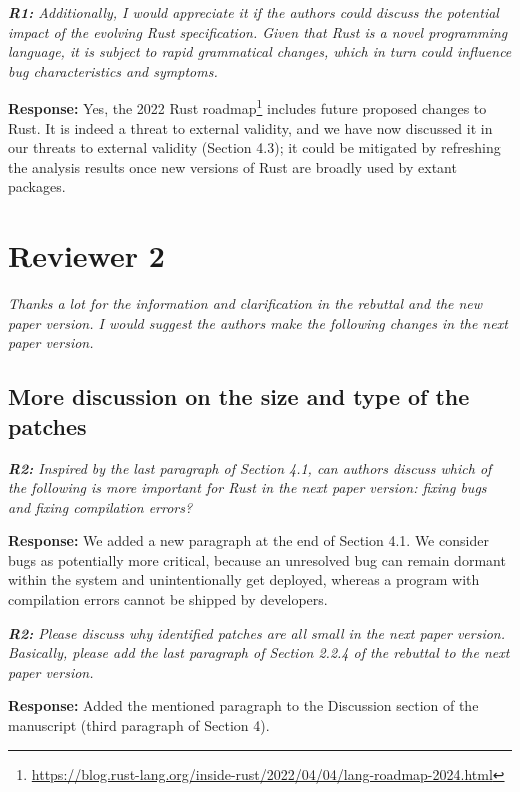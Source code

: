 \documentclass{article}
\begin{document}
\textit{\textbf{R1:} Additionally, I would appreciate it if the authors could discuss the potential impact of the evolving Rust specification. Given that Rust is a novel programming language, it is subject to rapid grammatical changes, which in turn could influence bug characteristics and symptoms.}

\vspace*{1em} \noindent \textbf{Response:} Yes, the 2022 Rust roadmap\footnote{\url{https://blog.rust-lang.org/inside-rust/2022/04/04/lang-roadmap-2024.html}} includes future proposed changes to Rust. It is indeed a threat to external validity, and we have now discussed it in our threats to external validity (Section 4.3); it could be mitigated by refreshing the analysis results once new versions of Rust are broadly used by extant packages.

\section{Reviewer 2}

\textit{Thanks a lot for the information and clarification in the rebuttal and the new paper version. I would suggest the authors make the following changes in the next paper version.}

\subsection{More discussion on the size and type of the patches}

\textit{\textbf{R2:} Inspired by the last paragraph of Section 4.1, can authors discuss which of the following is more important for Rust in the next paper version: fixing bugs and fixing compilation errors?}

\vspace*{1em} \noindent \textbf{Response:} We added a new paragraph at the end of Section 4.1. We consider bugs as potentially more critical, because an unresolved bug can remain dormant within the system and unintentionally get deployed, whereas a program with compilation errors cannot be shipped by developers.

\vspace*{1em} \noindent \textit{\textbf{R2:} Please discuss why identified patches are all small in the next paper version. Basically, please add the last paragraph of Section 2.2.4 of the rebuttal to the next paper version.}

\vspace*{1em} \noindent \textbf{Response:} Added the mentioned paragraph to the Discussion section of the manuscript (third paragraph of Section 4).
\end{document}

